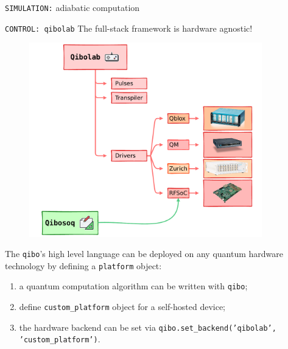 \documentclass[20pt, final]{beamer}
\newlength{\sepwidth}
\newlength{\colwidth}
\newcommand{\separatorcolumn}{\begin{column}{\sepwidth}\end{column}}
\begin{document}
\begin{frame}[t]
\begin{columns}[t]
\begin{column}{\colwidth}
\begin{block}{\texttt{SIMULATION:} adiabatic computation}
  \end{block}


  \begin{block}{\texttt{CONTROL: qibolab}}
  The full-stack framework is hardware agnostic!
  \begin{figure}
    \includegraphics[width=0.7  \textwidth]{figures/qibolab_instruments.pdf}
  \end{figure}

  The \texttt{qibo}'s high level language can be deployed on any quantum hardware
  technology by defining a \texttt{platform} object:
  \begin{enumerate}
  \item a quantum computation algorithm can be written with \texttt{qibo};
  \item define \texttt{custom\_platform} object for a self-hosted device;
  \item the hardware backend can be set via \texttt{qibo.set\_backend('qibolab', 'custom\_platform')}.
  \end{enumerate}
  \end{block}
  \end{column}

  \separatorcolumn

\begin{column}{\colwidth}



\end{column}
\end{columns}
\end{frame}
\end{document}

